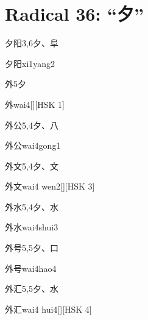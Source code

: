 
\section*{Radical 36: ``⼣''}

\begin{entry}{夕阳}{3,6}{⼣、⾩}
  \begin{phonetics}{夕阳}{xi1yang2}
  \end{phonetics}
\end{entry}

\begin{entry}{外}{5}{⼣}
  \begin{phonetics}{外}{wai4}[][HSK 1]
  \end{phonetics}
\end{entry}

\begin{entry}{外公}{5,4}{⼣、⼋}
  \begin{phonetics}{外公}{wai4gong1}
  \end{phonetics}
\end{entry}

\begin{entry}{外文}{5,4}{⼣、⽂}
  \begin{phonetics}{外文}{wai4 wen2}[][HSK 3]
  \end{phonetics}
\end{entry}

\begin{entry}{外水}{5,4}{⼣、⽔}
  \begin{phonetics}{外水}{wai4shui3}
  \end{phonetics}
\end{entry}

\begin{entry}{外号}{5,5}{⼣、⼝}
  \begin{phonetics}{外号}{wai4hao4}
  \end{phonetics}
\end{entry}

\begin{entry}{外汇}{5,5}{⼣、⽔}
  \begin{phonetics}{外汇}{wai4 hui4}[][HSK 4]
  \end{phonetics}
\end{entry}

